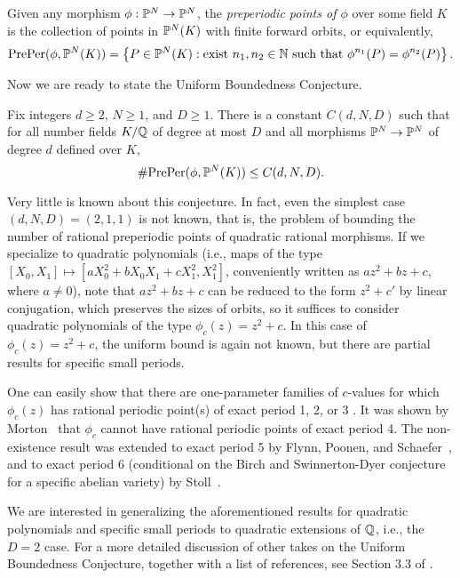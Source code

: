 \begin{definition}
  Given any morphism $\phi: \P^N \to \P^N$, the \emph{preperiodic
    points of $\phi$} over some field $K$ is the collection of points
  in $\P^N(K)$ with finite forward orbits, or equivalently,
  \[
  \preper(\phi, \P^N(K)) = \set{P \in \P^N(K) : \text{exist $n_1, n_2
      \in \N$ such that $\phi^{n_1}(P) = \phi^{n_2}(P)$}}.
  \]
\end{definition}

Now we are ready to state the Uniform Boundedness Conjecture.

\begin{conjecture}
  Fix integers $d \ge 2$, $N \ge 1$, and $D \ge 1$. There is a
  constant $C(d, N, D)$ such that for all number fields $K/\Q$ of
  degree at most $D$ and all morphisms $\P^N \to \P^N$ of degree $d$
  defined over $K$,
  \[
  \#\preper(\phi, \P^N(K)) \le C(d, N, D).
  \]
\end{conjecture}

Very little is known about this conjecture. In fact, even the simplest
case $(d, N, D) = (2, 1, 1)$ is not known, that is, the problem of
bounding the number of rational preperiodic points of quadratic
rational morphisms. If we specialize to quadratic polynomials (i.e.,
maps of the type $[X_0, X_1] \mapsto [a X_0^2 + b X_0 X_1 + c X_1^2,
X_1^2]$, conveniently written as $a z^2 + b z + c$, where $a \ne 0$),
note that $a z^2 + b z + c$ can be reduced to the form $z^2 + c'$ by
linear conjugation, which preserves the sizes of orbits, so it
suffices to consider quadratic polynomials of the type $\phi_c(z) =
z^2 + c$. In this case of $\phi_c(z) = z^2 + c$, the uniform bound is
again not known, but there are partial results for specific small
periods.

One can easily show that there are one-parameter families of
$c$-values for which $\phi_c(z)$ has rational periodic point(s) of
exact period 1, 2, or 3 \cite{MR1199627}. It was shown by
Morton~\cite{MR1665198} that $\phi_c$ cannot have rational periodic
points of exact period 4. The non-existence result was extended to
exact period 5 by Flynn, Poonen, and Schaefer~\cite{MR1480542}, and to
exact period 6 (conditional on the Birch and Swinnerton-Dyer
conjecture for a specific abelian variety) by Stoll~\cite{MR2465796}.

We are interested in generalizing the aforementioned results for
quadratic polynomials and specific small periods to quadratic
extensions of $\Q$, i.e., the $D = 2$ case. For a more detailed
discussion of other takes on the Uniform Boundedness Conjecture,
together with a list of references, see Section 3.3 of
\cite{MR2316407}.

